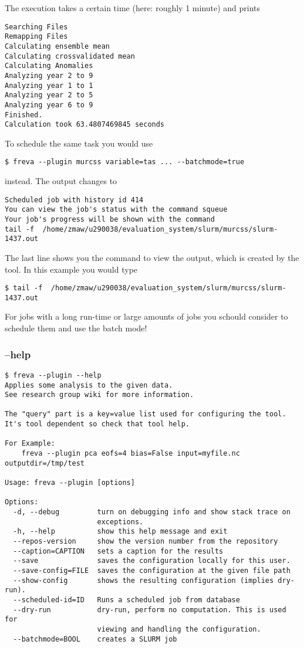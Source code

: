 \documentclass[a4paper,11pt]{ltxdoc}
\begin{document}
The execution takes a certain time (here: roughly 1 minute) and prints
\begin{lstlisting}
Searching Files
Remapping Files
Calculating ensemble mean
Calculating crossvalidated mean
Calculating Anomalies
Analyzing year 2 to 9
Analyzing year 1 to 1
Analyzing year 2 to 5
Analyzing year 6 to 9
Finished.
Calculation took 63.4807469845 seconds
\end{lstlisting}
To schedule the same task you would use
\begin{lstlisting}
$ freva --plugin murcss variable=tas ... --batchmode=true 
\end{lstlisting}

instead. The output changes to
\begin{lstlisting}
Scheduled job with history id 414
You can view the job's status with the command squeue
Your job's progress will be shown with the command
tail -f  /home/zmaw/u290038/evaluation_system/slurm/murcss/slurm-1437.out
\end{lstlisting}
The last line shows you the command to view the output, which is created by the tool.
In this example you would type
\begin{lstlisting}
$ tail -f  /home/zmaw/u290038/evaluation_system/slurm/murcss/slurm-1437.out
\end{lstlisting}
For jobs with a long run-time or large amounts of jobs you schould consider
to schedule them and use the batch mode!

\subsubsection*{--help}
\begin{lstlisting}
$ freva --plugin --help
Applies some analysis to the given data.
See research group wiki for more information.

The "query" part is a key=value list used for configuring the tool. 
It's tool dependent so check that tool help.

For Example:
    freva --plugin pca eofs=4 bias=False input=myfile.nc outputdir=/tmp/test

Usage: freva --plugin [options]

Options:
  -d, --debug         turn on debugging info and show stack trace on
                      exceptions.
  -h, --help          show this help message and exit
  --repos-version     show the version number from the repository
  --caption=CAPTION   sets a caption for the results
  --save              saves the configuration locally for this user.
  --save-config=FILE  saves the configuration at the given file path
  --show-config       shows the resulting configuration (implies dry-run).
  --scheduled-id=ID   Runs a scheduled job from database
  --dry-run           dry-run, perform no computation. This is used for
                      viewing and handling the configuration.
  --batchmode=BOOL    creates a SLURM job
\end{lstlisting}
\end{document}
